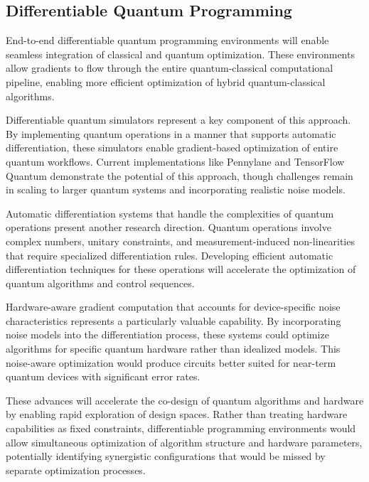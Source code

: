\subsection{Differentiable Quantum Programming}

End-to-end differentiable quantum programming environments will enable seamless integration of classical and quantum optimization. These environments allow gradients to flow through the entire quantum-classical computational pipeline, enabling more efficient optimization of hybrid quantum-classical algorithms.

Differentiable quantum simulators represent a key component of this approach. By implementing quantum operations in a manner that supports automatic differentiation, these simulators enable gradient-based optimization of entire quantum workflows. Current implementations like Pennylane and TensorFlow Quantum demonstrate the potential of this approach, though challenges remain in scaling to larger quantum systems and incorporating realistic noise models.

Automatic differentiation systems that handle the complexities of quantum operations present another research direction. Quantum operations involve complex numbers, unitary constraints, and measurement-induced non-linearities that require specialized differentiation rules. Developing efficient automatic differentiation techniques for these operations will accelerate the optimization of quantum algorithms and control sequences.

Hardware-aware gradient computation that accounts for device-specific noise characteristics represents a particularly valuable capability. By incorporating noise models into the differentiation process, these systems could optimize algorithms for specific quantum hardware rather than idealized models. This noise-aware optimization would produce circuits better suited for near-term quantum devices with significant error rates.

These advances will accelerate the co-design of quantum algorithms and hardware by enabling rapid exploration of design spaces. Rather than treating hardware capabilities as fixed constraints, differentiable programming environments would allow simultaneous optimization of algorithm structure and hardware parameters, potentially identifying synergistic configurations that would be missed by separate optimization processes.

